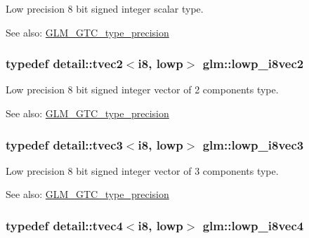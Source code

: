 Low precision 8 bit signed integer scalar type. \begin{Desc}
\item[See also:]\hyperlink{group__gtc__type__precision}{GLM\_\-GTC\_\-type\_\-precision} \end{Desc}
\hypertarget{group__gtc__type__precision_g511280c8869c7c79bba3c359f37f5559}{
\subsubsection[lowp\_\-i8vec2]{\setlength{\rightskip}{0pt plus 5cm}typedef detail::tvec2$<$i8, lowp$>$ {\bf glm::lowp\_\-i8vec2}}}
\label{group__gtc__type__precision_g511280c8869c7c79bba3c359f37f5559}


Low precision 8 bit signed integer vector of 2 components type. \begin{Desc}
\item[See also:]\hyperlink{group__gtc__type__precision}{GLM\_\-GTC\_\-type\_\-precision} \end{Desc}
\hypertarget{group__gtc__type__precision_g048811f03c327d4b56564a72d98800e8}{
\subsubsection[lowp\_\-i8vec3]{\setlength{\rightskip}{0pt plus 5cm}typedef detail::tvec3$<$i8, lowp$>$ {\bf glm::lowp\_\-i8vec3}}}
\label{group__gtc__type__precision_g048811f03c327d4b56564a72d98800e8}


Low precision 8 bit signed integer vector of 3 components type. \begin{Desc}
\item[See also:]\hyperlink{group__gtc__type__precision}{GLM\_\-GTC\_\-type\_\-precision} \end{Desc}
\hypertarget{group__gtc__type__precision_g095202095a1fefbdae4a974c3b750223}{
\subsubsection[lowp\_\-i8vec4]{\setlength{\rightskip}{0pt plus 5cm}typedef detail::tvec4$<$i8, lowp$>$ {\bf glm::lowp\_\-i8vec4}}}
\label{group__gtc__type__precision_g095202095a1fefbdae4a974c3b750223}



